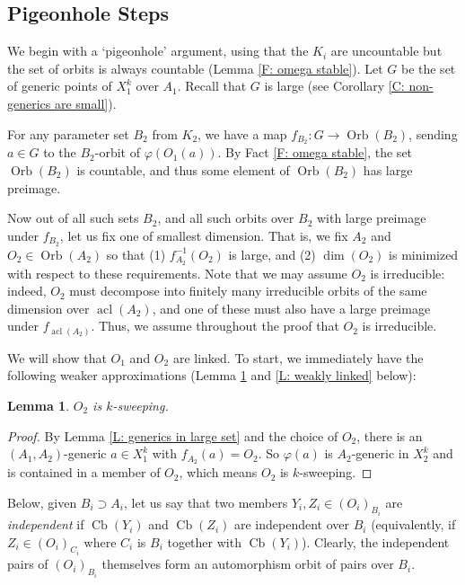 \documentclass{amsart}
\newtheorem{lemma}[theorem]{Lemma}
\theoremstyle{definition}
\begin{document}
\subsection{Pigeonhole Steps}

    We begin with a `pigeonhole' argument, using that the $K_i$ are uncountable but the set of orbits is always countable (Lemma \ref{F: omega stable}). Let $G$ be the set of generic points of $X_1^k$ over $A_1$. Recall that $G$ is large (see Corollary \ref{C: non-generics are small}).
    
    For any parameter set $B_2$ from $K_2$, we have a map $f_{B_2}:G\rightarrow\operatorname{Orb}(B_2)$, sending $a\in G$ to the $B_2$-orbit of $\varphi(O_1(a))$. By Fact \ref{F: omega stable}, the set $\operatorname{Orb}(B_2)$ is countable, and thus some element of $\operatorname{Orb}(B_2)$ has large preimage.
    
    Now out of all such sets $B_2$, and all such orbits over $B_2$ with large preimage under $f_{B_2}$, let us fix one of smallest dimension. That is, we fix $A_2$ and $O_2\in\operatorname{Orb}(A_2)$ so that (1) $f_{A_2}^{-1}(O_2)$ is large, and (2) $\dim(O_2)$ is minimized with respect to these requirements. Note that we may assume $O_2$ is irreducible: indeed, $O_2$ must decompose into finitely many irreducible orbits of the same dimension over $\operatorname{acl}(A_2)$, and one of these must also have a large preimage under $f_{\operatorname{acl}(A_2)}$. Thus, we assume throughout the proof that $O_2$ is irreducible. 

    We will show that $O_1$ and $O_2$ are linked. To start, we immediately have the following weaker approximations (Lemma \ref{L: O_2 k-sweeping} and \ref{L: weakly linked} below):
    
    \begin{lemma}\label{L: O_2 k-sweeping}
        $O_2$ is $k$-sweeping.
    \end{lemma}
    \begin{proof}
        By Lemma \ref{L: generics in large set} and the choice of $O_2$, there is an $(A_1,A_2)$-generic $a\in X_1^k$ with $f_{A_2}(a)=O_2$. So $\varphi(a)$ is $A_2$-generic in $X_2^k$ and is contained in a member of $O_2$, which means $O_2$ is $k$-sweeping.
    \end{proof}

   Below, given $B_i\supset A_i$, let us say that two members $Y_i,Z_i\in(O_i)_{B_i}$ are \textit{independent} if $\operatorname{Cb}(Y_i)$ and $\operatorname{Cb}(Z_i)$ are independent over $B_i$ (equivalently, if $Z_i\in(O_i)_{C_i}$ where $C_i$ is $B_i$ together with $\operatorname{Cb}(Y_i)$). Clearly, the independent pairs of $(O_i)_{B_i}$ themselves form an automorphism orbit of pairs over $B_i$.
\end{document}
